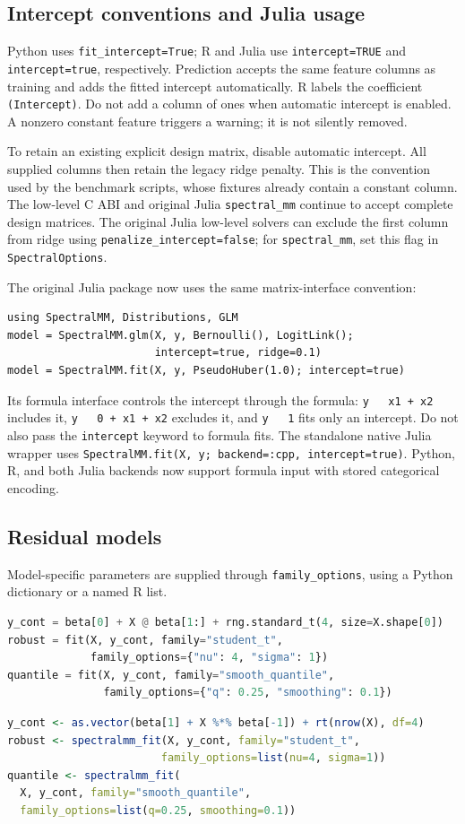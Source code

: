 \documentclass[11pt,a4paper]{article}
\newcommand{\code}[1]{\texttt{#1}}
\begin{document}
\subsection{Intercept conventions and Julia usage}
Python uses \code{fit\_intercept=True}; R and Julia use
\code{intercept=TRUE} and \code{intercept=true}, respectively.
Prediction accepts the same feature columns as training and adds the fitted
intercept automatically. R labels the coefficient \code{(Intercept)}.
Do not add a column of ones when automatic intercept is enabled. A nonzero
constant feature triggers a warning; it is not silently removed.

To retain an existing explicit design matrix, disable automatic intercept.
All supplied columns then retain the legacy ridge penalty. This is the convention
used by the benchmark scripts, whose fixtures already contain a constant column.
The low-level C ABI and original Julia \code{spectral\_mm} continue to accept
complete design matrices. The original Julia low-level solvers can exclude the
first column from ridge using \code{penalize\_intercept=false}; for
\code{spectral\_mm}, set this flag in \code{SpectralOptions}.

The original Julia package now uses the same matrix-interface convention:
\begin{lstlisting}
using SpectralMM, Distributions, GLM
model = SpectralMM.glm(X, y, Bernoulli(), LogitLink();
                       intercept=true, ridge=0.1)
model = SpectralMM.fit(X, y, PseudoHuber(1.0); intercept=true)
\end{lstlisting}
Its formula interface controls the intercept through the formula:
\code{y ~ x1 + x2} includes it, \code{y ~ 0 + x1 + x2} excludes it,
and \code{y ~ 1} fits only an intercept. Do not also pass the
\code{intercept} keyword to formula fits. The standalone native Julia wrapper
uses \code{SpectralMM.fit(X, y; backend=:cpp, intercept=true)}.
Python, R, and both Julia backends now support formula input with stored categorical encoding.

\subsection{Residual models}
Model-specific parameters are supplied through \code{family\_options}, using a
Python dictionary or a named R list.
\begin{lstlisting}[language=Python]
y_cont = beta[0] + X @ beta[1:] + rng.standard_t(4, size=X.shape[0])
robust = fit(X, y_cont, family="student_t",
             family_options={"nu": 4, "sigma": 1})
quantile = fit(X, y_cont, family="smooth_quantile",
               family_options={"q": 0.25, "smoothing": 0.1})
\end{lstlisting}
\begin{lstlisting}[language=R]
y_cont <- as.vector(beta[1] + X %*% beta[-1]) + rt(nrow(X), df=4)
robust <- spectralmm_fit(X, y_cont, family="student_t",
                        family_options=list(nu=4, sigma=1))
quantile <- spectralmm_fit(
  X, y_cont, family="smooth_quantile",
  family_options=list(q=0.25, smoothing=0.1))
\end{lstlisting}
\end{document}
